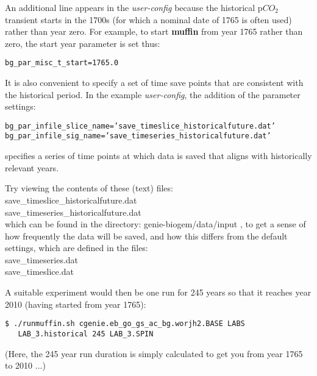 \documentclass[11pt,fleqn]{book} %
\begin{document}
An additional line appears in the \textit{user-config} because the historical p\(CO_{2}\) transient starts in the 1700s (for which a nominal date of 1765 is often used) rather than year zero. For example, to start \textbf{muffin} from year 1765 rather than zero, the start year parameter is set thus:
\vspace{-2pt}\begin{verbatim}
bg_par_misc_t_start=1765.0
\end{verbatim}\vspace{-2pt}
It is also convenient to specify a set of time save points that are consistent with the historical period. In the example \textit{user-config}, the addition of the parameter settings:
\vspace{-2pt}\begin{verbatim}
bg_par_infile_slice_name=’save_timeslice_historicalfuture.dat’
bg_par_infile_sig_name=’save_timeseries_historicalfuture.dat’
\end{verbatim}\vspace{-2pt}
 specifies a series of time points at which data is saved that aligns with historically relevant years.

Try viewing the contents of these (text) files:
\vspace{2pt}
\\ \small\textsf{save\_timeslice\_historicalfuture.dat }\normalsize
\\ \small\textsf{save\_timeseries\_historicalfuture.dat }\normalsize
\vspace{2pt}
\\which can be found in the directory: \footnotesize\textsf{genie-biogem/data/input }\normalsize, to get a sense of how frequently the data will be saved, and how this differs from the default settings, which are defined in the files:
\vspace{2pt}
\\ \small\textsf{save\_timeseries.dat }\normalsize
\\ \small\textsf{save\_timeslice.dat }\normalsize
\vspace{2pt}

A suitable experiment would then be one run for 245 years so that it reaches year 2010 (having started from year 1765):
\vspace{-2pt}\begin{verbatim}
$ ./runmuffin.sh cgenie.eb_go_gs_ac_bg.worjh2.BASE LABS
   LAB_3.historical 245 LAB_3.SPIN
\end{verbatim}\vspace{-2pt}
(Here, the 245 year run duration is simply calculated to get you from year 1765 to 2010 ...)
\end{document}
